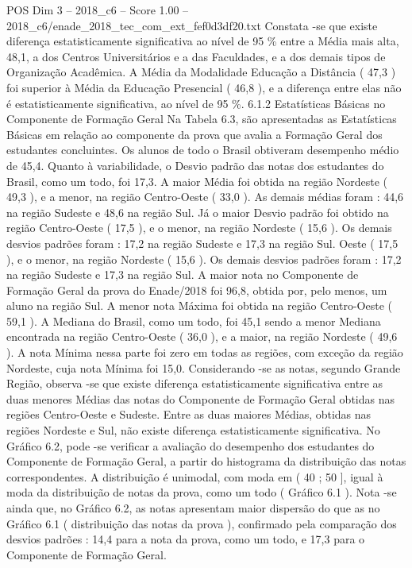 \begin{textsample}{POS Dim 3 – 2018\_c6 – Score 1.00 – 2018\_c6/enade\_2018\_tec\_com\_ext\_fef0d3df20.txt}
Constata -se que existe diferença estatisticamente significativa ao nível de 95 \% entre a Média mais alta, 48,1, a dos Centros Universitários e a das Faculdades, e a dos demais tipos de Organização Acadêmica.
A Média da Modalidade Educação a Distância ( 47,3 ) foi superior à Média da Educação Presencial ( 46,8 ), e a diferença entre elas não é estatisticamente significativa, ao nível de 95 \%. 6.1.2 Estatísticas Básicas no Componente de Formação Geral Na Tabela 6.3, são apresentadas as Estatísticas Básicas em relação ao componente da prova que avalia a Formação Geral dos estudantes concluintes.
Os alunos de todo o Brasil obtiveram desempenho médio de 45,4.
Quanto à variabilidade, o Desvio padrão das notas dos estudantes do Brasil, como um todo, foi 17,3.
A maior Média foi obtida na região Nordeste ( 49,3 ), e a menor, na região Centro-Oeste ( 33,0 ).
As demais médias foram : 44,6 na região Sudeste e 48,6 na região Sul.
Já o maior Desvio padrão foi obtido na região Centro-Oeste ( 17,5 ), e o menor, na região Nordeste ( 15,6 ).
Os demais desvios padrões foram : 17,2 na região Sudeste e 17,3 na região Sul.
Oeste ( 17,5 ), e o menor, na região Nordeste ( 15,6 ).
Os demais desvios padrões foram : 17,2 na região Sudeste e 17,3 na região Sul.
A maior nota no Componente de Formação Geral da prova do Enade/2018 foi 96,8, obtida por, pelo menos, um aluno na região Sul.
A menor nota Máxima foi obtida na região Centro-Oeste ( 59,1 ).
A Mediana do Brasil, como um todo, foi 45,1 sendo a menor Mediana encontrada na região Centro-Oeste ( 36,0 ), e a maior, na região Nordeste ( 49,6 ).
A nota Mínima nessa parte foi zero em todas as regiões, com exceção da região Nordeste, cuja nota Mínima foi 15,0.
Considerando -se as notas, segundo Grande Região, observa -se que existe diferença estatisticamente significativa entre as duas menores Médias das notas do Componente de Formação Geral obtidas nas regiões Centro-Oeste e Sudeste.
Entre as duas maiores Médias, obtidas nas regiões Nordeste e Sul, não existe diferença estatisticamente significativa.
No Gráfico 6.2, pode -se verificar a avaliação do desempenho dos estudantes do Componente de Formação Geral, a partir do histograma da distribuição das notas correspondentes.
A distribuição é unimodal, com moda em ( 40 ; 50 ], igual à moda da distribuição de notas da prova, como um todo ( Gráfico 6.1 ).
Nota -se ainda que, no Gráfico 6.2, as notas apresentam maior dispersão do que as no Gráfico 6.1 ( distribuição das notas da prova ), confirmado pela comparação dos desvios padrões : 14,4 para a nota da prova, como um todo, e 17,3 para o Componente de Formação Geral.

\end{textsample}
